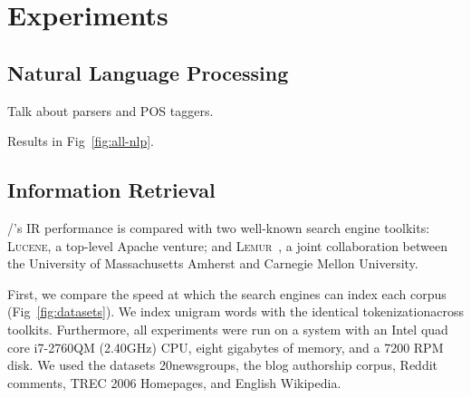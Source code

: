 \section{Experiments}

\subsection{Natural Language Processing}

Talk about parsers and POS taggers.

Results in Fig~\ref{fig:all-nlp}.



\subsection{Information Retrieval}

\meta/'s IR performance is compared with two well-known search engine toolkits:
\textsc{Lucene}\footnotemark[12], a top-level Apache venture; and
\textsc{Lemur}~\cite{lemur}, a joint collaboration between the University of
Massachusetts Amherst and Carnegie Mellon University.


First, we compare the speed at which the search engines can index each corpus
(Fig~\ref{fig:datasets}). We index unigram words with the identical
tokenization\footnotemark[1] across toolkits. Furthermore, all experiments were
run on a system with an Intel quad core i7-2760QM (2.40GHz) CPU, eight gigabytes
of memory, and a 7200 RPM disk. We used the datasets
20newsgroups\footnotemark[6], the blog authorship corpus\footnotemark[7], Reddit
comments\footnotemark[5], TREC 2006 Homepages\footnotemark[8], and English
Wikipedia\footnotemark[9].



